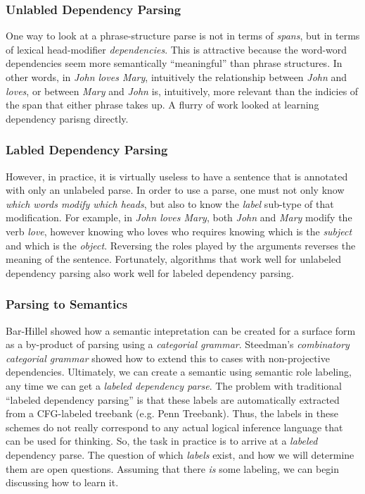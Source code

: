 \documentclass[12pt]{article}
\begin{document}
\subsubsection{Unlabled Dependency Parsing}
One way to look at a phrase-structure parse is not in terms of {\em spans}, but in terms of lexical head-modifier {\em dependencies}.
This is attractive because the word-word dependencies seem more semantically ``meaningful'' than phrase structures.
In other words, in {\em John loves Mary}, intuitively the relationship between {\em John} and {\em loves}, or between {\em Mary} and {\em John} is, intuitively, more relevant than the indicies of the span that either phrase takes up.
A flurry of work looked at learning dependency parisng directly.
\subsubsection{Labled Dependency Parsing}
However, in practice, it is virtually useless to have a sentence that is annotated with only an unlabeled parse.
In order to use a parse, one must not only know {\em which words modify which heads}, but also to know the {\em label} sub-type of that modification.
For example, in {\em John loves Mary}, both {\em John} and {\em Mary} modify the verb {\em love}, however knowing who loves who requires knowing which is the {\em subject} and which is the {\em object}.
Reversing the roles played by the arguments reverses the meaning of the sentence.
Fortunately, algorithms that work well for unlabeled dependency parsing also work well for labeled dependency parsing.

\subsubsection{Parsing to Semantics}
Bar-Hillel showed how a semantic intepretation can be created for a surface form as a by-product of parsing using a {\em categorial grammar}.
Steedman's {\em combinatory categorial grammar} showed how to extend this to cases with non-projective dependencies.
Ultimately, we can create a semantic using semantic role labeling, any time we can get a {\em labeled dependency parse}.
The problem with traditional ``labeled dependency parsing'' is that these labels are automatically extracted from a CFG-labeled treebank (e.g. Penn Treebank).
Thus, the labels in these schemes do not really correspond to any actual logical inference language that can be used for thinking.
So, the task in practice is to arrive at a {\em labeled} dependency parse.
The question of which {\em labels} exist, and how we will determine them are open questions.
Assuming that there {\em is} some labeling, we can begin discussing how to learn it.
\end{document}
